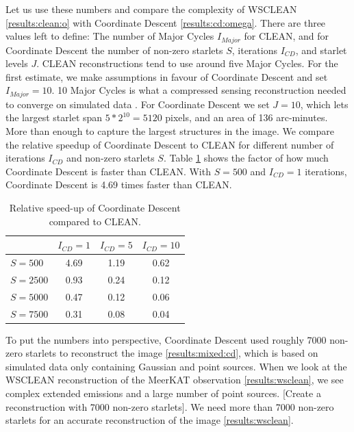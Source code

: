 Let us use these numbers and compare the complexity of WSCLEAN \eqref{results:clean:o} with Coordinate Descent \eqref{results:cd:omega}. There are three values left to define: The number of Major Cycles $I_{Major}$ for CLEAN, and for Coordinate Descent the  number of non-zero starlets $S$, iterations $I_{CD}$, and starlet levels $J$. CLEAN reconstructions tend to use around five Major Cycles. For the first estimate, we make assumptions in favour of Coordinate Descent and set $I_{Major} = 10$. 10 Major Cycles is what a compressed sensing reconstruction needed to converge on simulated data \cite{pratley2018fast}. For Coordinate Descent we set $J = 10$, which lets the largest starlet span $5*2^{10} = 5120$ pixels, and an area of 136 arc-minutes. More than enough to capture the largest structures in the image. We compare the relative speedup of Coordinate Descent to CLEAN for different number of iterations $I_{CD}$ and non-zero starlets $S$. Table \ref{res:cd:table} shows the factor of how much Coordinate Descent is faster than CLEAN. With $S=500$ and $I_{CD} = 1$ iterations, Coordinate Descent is 4.69 times faster than CLEAN. 

\begin{table}[h!]
	\begin{center}
		\begin{tabular}{l|c|c|c} %
			 & $I_{CD} = 1$ & $I_{CD} = 5$ &  $I_{CD} = 10$\\
			\hline
			$S=500$ & 4.69 &  1.19 & 0.62 \\
			$S=2500$ & 0.93 &  0.24 & 0.12 \\
			$S=5000$ & 0.47 &  0.12 & 0.06 \\
			$S=7500$ & 0.31 &  0.08 & 0.04 \\
		\end{tabular}
		\caption{Relative speed-up of Coordinate Descent compared to CLEAN. }
		\label{res:cd:table}
	\end{center}
\end{table}

To put the numbers into perspective, Coordinate Descent used roughly 7000 non-zero starlets to reconstruct the image \ref{results:mixed:cd}, which is based on simulated data only containing Gaussian and point sources. When we look at the WSCLEAN reconstruction of the MeerKAT observation \ref{results:wsclean}, we see complex extended emissions and a large number of point sources. [Create a reconstruction with 7000 non-zero starlets]. We need more than 7000 non-zero starlets for an accurate reconstruction of the image \ref{results:wsclean}. 

